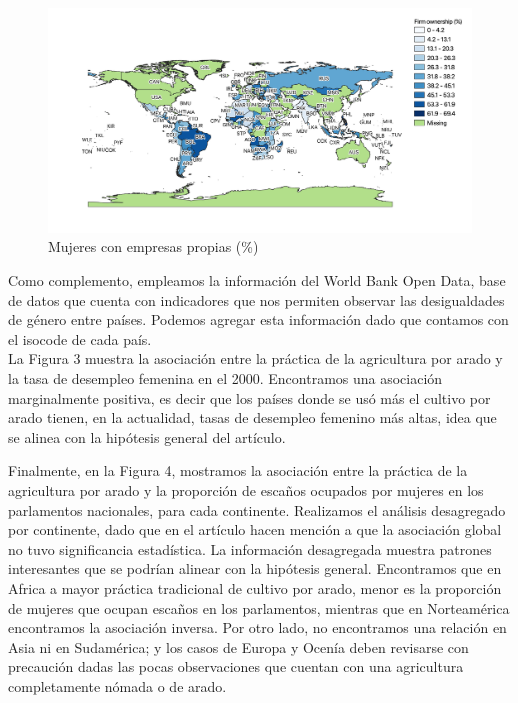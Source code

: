 \documentclass[11pt,a4paper]{article}
\begin{document}
\begin{figure}[!h]
    \centering
    \includegraphics[width=15cm]{Graph/Graph 2.png}
   \caption{Mujeres con empresas propias (\%)}
    \label{fig:my_label}
\end{figure}

Como complemento, empleamos la información del World Bank Open Data, base de datos que cuenta con indicadores que nos permiten observar las desigualdades de género entre países. Podemos agregar esta información dado que contamos con el isocode de cada país. 
\\
La Figura 3 muestra la asociación entre la práctica de la agricultura por arado y la tasa de desempleo femenina en el 2000. Encontramos una asociación marginalmente positiva, es decir que los países donde se usó más el cultivo por arado tienen, en la actualidad, tasas de desempleo femenino más altas, idea que se alinea con la hipótesis general del artículo.

Finalmente, en la Figura 4, mostramos la asociación entre la práctica de la agricultura por arado y la proporción de escaños ocupados por mujeres en los parlamentos nacionales, para cada continente. Realizamos el análisis desagregado por continente, dado que en el artículo hacen mención a que la asociación global no tuvo significancia estadística. La información desagregada muestra patrones interesantes que se podrían alinear con la hipótesis general. Encontramos que en Africa a mayor práctica tradicional de cultivo por arado, menor es la proporción de mujeres que ocupan escaños en los parlamentos, mientras que en Norteamérica encontramos la asociación inversa. Por otro lado, no encontramos una relación en Asia ni en Sudamérica; y los casos de Europa y Ocenía deben revisarse con precaución dadas las pocas observaciones que cuentan con una agricultura completamente nómada o de arado.
\end{document}
